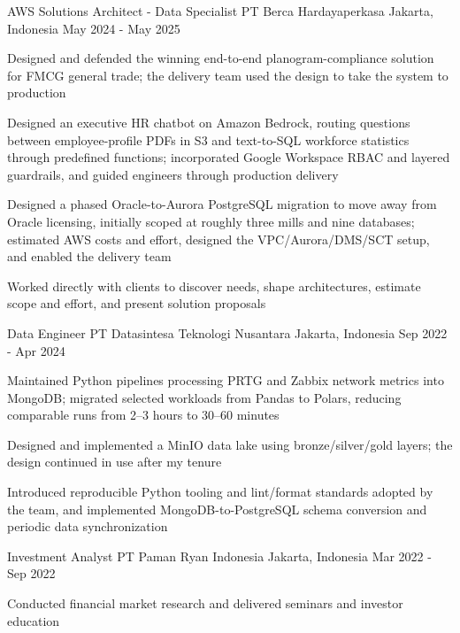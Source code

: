 \begin{cventries}
  \cventry
    {AWS Solutions Architect - Data Specialist}
    {PT Berca Hardayaperkasa}
    {Jakarta, Indonesia}
    {May 2024 - May 2025}
    {
      \begin{cvitems}
        \item {Designed and defended the winning end-to-end planogram-compliance solution for FMCG general trade; the delivery team used the design to take the system to production}
        \item {Designed an executive HR chatbot on Amazon Bedrock, routing questions between employee-profile PDFs in S3 and text-to-SQL workforce statistics through predefined functions; incorporated Google Workspace RBAC and layered guardrails, and guided engineers through production delivery}
        \item {Designed a phased Oracle-to-Aurora PostgreSQL migration to move away from Oracle licensing, initially scoped at roughly three mills and nine databases; estimated AWS costs and effort, designed the VPC/Aurora/DMS/SCT setup, and enabled the delivery team}
        \item {Worked directly with clients to discover needs, shape architectures, estimate scope and effort, and present solution proposals}
      \end{cvitems}
    }

  \cventry
    {Data Engineer}
    {PT Datasintesa Teknologi Nusantara}
    {Jakarta, Indonesia}
    {Sep 2022 - Apr 2024}
    {
      \begin{cvitems}
        \item {Maintained Python pipelines processing PRTG and Zabbix network metrics into MongoDB; migrated selected workloads from Pandas to Polars, reducing comparable runs from 2--3 hours to 30--60 minutes}
        \item {Designed and implemented a MinIO data lake using bronze/silver/gold layers; the design continued in use after my tenure}
        \item {Introduced reproducible Python tooling and lint/format standards adopted by the team, and implemented MongoDB-to-PostgreSQL schema conversion and periodic data synchronization}
      \end{cvitems}
    }

  \cventry
    {Investment Analyst} %
    {PT Paman Ryan Indonesia} %
    {Jakarta, Indonesia} %
    {Mar 2022 - Sep 2022} %
    {
      \begin{cvitems} %
        \item {Conducted financial market research and delivered seminars and investor education}
      \end{cvitems}
    }


\end{cventries}
